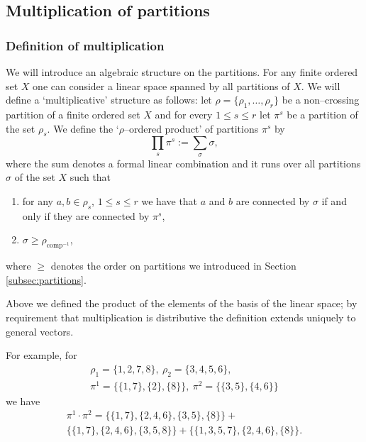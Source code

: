 \documentclass[12pt,dvips]{amsart}
\numberwithin{equation}{section} \numberwithin{figure}{section}
\theoremstyle{plain}
\theoremstyle{definition}
\theoremstyle{remark}
\DeclareMathOperator{\comp}{comp}
\newcommand{\compinv}{{\comp^{-1}}}
\begin{document}
\subsection{Multiplication of partitions}
\label{sec:mnozeniepartycji} \subsubsection{Definition of
multiplication} We will introduce an algebraic structure on the
partitions. For any finite ordered set $X$ one can consider a linear
space spanned by all partitions of $X$. We will define a
`multiplicative' structure as follows: let
$\rho=\{\rho_1,\dots,\rho_r\}$ be a non--crossing partition of a
finite ordered set $X$ and for every $1\leq s\leq r$ let $\pi^s$ be
a partition of the set $\rho_s$. We define the `$\rho$--ordered
product' of partitions $\pi^s$ by  
\begin{equation}
\label{eq:definicjamnozenia} \prod_{s} \pi^s :=\sum_{\sigma} \sigma,
\end{equation}
where the sum denotes a formal linear combination and it runs over
all partitions $\sigma$ of the set $X$ such that
\begin{enumerate}
\item for any $a,b\in\rho_s$, $1\leq s\leq r$ we have that $a$ and
$b$ are connected by $\sigma$ if and only if they are connected by
$\pi^s$, \item $\sigma\geq \rho_{\compinv}$,
\end{enumerate}
where $\geq$ denotes the order on partitions we introduced in
Section \ref{subsec:partitions}.

Above we defined the product of the elements of the basis of the
linear space; by requirement that multiplication is distributive the
definition extends uniquely to general vectors.

For example, for
\begin{multline}
\label{eq:przykladmnozenie} \rho_1=\{1,2,7,8\},\
\rho_2=\{3,4,5,6\},\\  \pi^1=\big\{ \{1,7\}, \{2\},\{8\} \big\},\
\pi^2=\big\{ \{3,5\},\{4,6\} \big\}
\end{multline}
we have
\begin{multline*}\pi^1 \cdot \pi^2 =
\big\{ \{1,7\},\{2,4,6\},\{3,5\},\{8\} \big\}+\\
\big\{ \{1,7\},\{2,4,6\},\{3,5,8\} \big\}+ \big\{
\{1,3,5,7\},\{2,4,6\},\{8\} \big\}.
\end{multline*}
\end{document}
